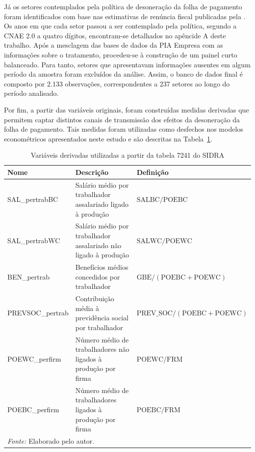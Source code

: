 \documentclass[12pt,a4paper,oneside]{article}
\begin{document}
Já os setores contemplados pela política de desoneração da folha de pagamento foram identificados com base nas estimativas de renúncia fiscal publicadas pela \citet{desoneracao2019}. Os anos em que cada setor passou a ser contemplado pela política, segundo a CNAE 2.0 a quatro dígitos, encontram-se detalhados no apêncide A deste trabalho. Após a mesclagem das bases de dados da PIA Empresa com as informações sobre o tratamento, procedeu-se à construção de um painel curto balanceado. Para tanto, setores que apresentavam informações ausentes em algum período da amostra foram excluídos da análise. Assim, o banco de dados final é composto por 2.133 observações, correspondentes a 237 setores ao longo do período analisado.

Por fim, a partir das variáveis originais, foram construídas medidas derivadas que permitem captar distintos canais de transmissão dos efeitos da desoneração da folha de pagamento. Tais medidas foram utilizadas como desfechos nos modelos econométricos apresentados neste estudo e são descritas na Tabela~\ref{tab:variables_derivadas}.

\begin{table}[H]
	\centering
	\caption{Variáveis derivadas utilizadas a partir da tabela 7241 do SIDRA}
	\label{tab:variables_derivadas}
	\begin{tabular}{|l|p{6cm}|p{6cm}|}
		\hline
		\textbf{Nome} & \textbf{Descrição} & \textbf{Definição} \\
		\hline
		SAL\_pertrabBC 
		& Salário médio por trabalhador assalariado ligado à produção 
		& $\text{SALBC} / \text{POEBC}$ \\
		\hline
		SAL\_pertrabWC 
		& Salário médio por trabalhador assalariado não ligado à produção 
		& $\text{SALWC} / \text{POEWC}$ \\
		\hline
		BEN\_pertrab 
		& Benefícios médios concedidos por trabalhador 
		& $\text{GBE} / (\text{POEBC} + \text{POEWC})$ \\
		\hline
		PREVSOC\_pertrab 
		& Contribuição média à previdência social por trabalhador 
		& $\text{PREV\_SOC} / (\text{POEBC} + \text{POEWC})$ \\
		\hline
		POEWC\_perfirm  
		& Número médio de trabalhadores não ligados à produção por firma 
		& $\text{POEWC} / \text{FRM}$ \\
		\hline
		POEBC\_perfirm 
		& Número médio de trabalhadores ligados à produção por firma 
		& $\text{POEBC} / \text{FRM}$ \\
		\hline
		\multicolumn{3}{l}{\footnotesize \textit{Fonte:} Elaborado pelo autor.} \\
	\end{tabular}

\end{table}
\end{document}
